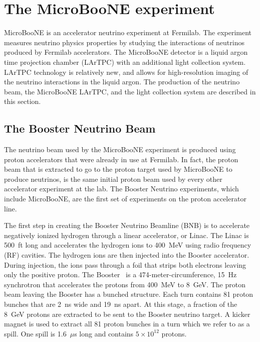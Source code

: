 \section{The MicroBooNE experiment}\label{microboone}
MicroBooNE is an accelerator neutrino experiment at Fermilab. The experiment
measures neutrino physics properties by studying the interactions of neutrinos
produced by Fermilab accelerators. The MicroBooNE detector is a liquid argon
time projection chamber (LArTPC) with an additional light collection system.
LArTPC technology is relatively new, and allows for high-resolution imaging of
the neutrino interactions in the liquid argon. The production of the neutrino
beam, the MicroBooNE LArTPC, and the light collection system are described in
this section.

\subsection{The Booster Neutrino Beam}\label{sec:beam}
  The neutrino beam used by the MicroBooNE experiment is produced using proton
  accelerators that were already in use at Fermilab. In fact, the proton beam
  that is extracted to go to the proton target used by MicroBooNE to produce
  neutrinos, is the same initial proton beam used by every other accelerator
  experiment at the lab. The Booster Neutrino experiments, which include
  MicroBooNE, are the first set of experiments on the proton accelerator line.

  The first step in creating the Booster Neutrino Beamline (BNB) is to
  accelerate negatively ionized hydrogen through a linear accelerator, or
  Linac. The Linac is 500~ft long and accelerates the hydrogen ions to
  400~MeV using radio frequency (RF) cavities. The hydrogen ions are then
  injected into the Booster accelerator. During injection, the ions pass
  through a foil that strips both electrons leaving only the positive proton.
  The Booster~\cite{MinibooneBeam} is a 474-meter-circumference, 15~Hz
  synchrotron that accelerates the protons from 400~MeV to 8~GeV. The proton
  beam leaving the Booster has a bunched structure. Each turn contains 81
  proton bunches that are 2~ns wide and 19~ns apart. At this stage, a
  fraction of the 8~GeV protons are extracted to be sent to the Booster
  neutrino target. A kicker magnet is used to extract all 81 proton bunches
  in a turn which we refer to as a spill. One spill is 1.6~$\mu$s long and
  contains $5\times 10^{12}$ protons.


